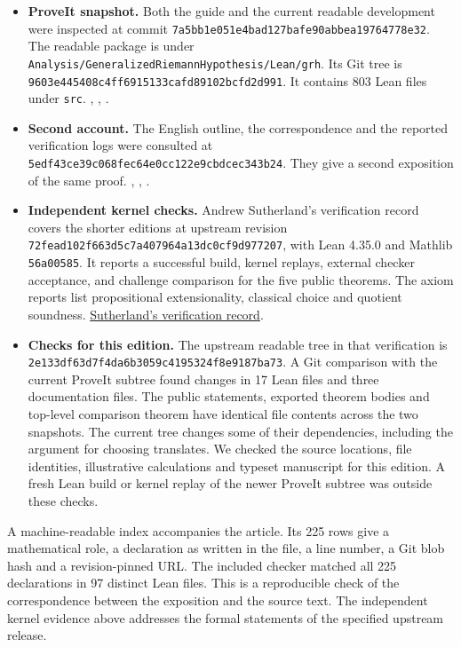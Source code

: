 \begin{itemize}
 \item \textbf{ProveIt snapshot.} Both the guide and the current readable development were inspected at commit \texttt{7a5bb1e051e4bad127bafe90abbea19764778e32}. The readable package is under \texttt{Analysis/GeneralizedRiemannHypothesis/Lean/grh}. Its Git tree is \texttt{9603e445408c4ff6915133cafd89102bcfd2d991}. It contains 803 Lean files under \texttt{src}. , , .
 \item \textbf{Second account.} The English outline, the correspondence and the reported verification logs were consulted at \texttt{5edf43ce39c068fec64e0cc122e9cbdcec343b24}. They give a second exposition of the same proof. , , .
 \item \textbf{Independent kernel checks.} Andrew Sutherland's verification record covers the shorter editions at upstream revision \texttt{72fead102f663d5c7a407964a13dc0cf9d977207}, with Lean 4.35.0 and Mathlib \texttt{56a00585}. It reports a successful build, kernel replays, external checker acceptance, and challenge comparison for the five public theorems. The axiom reports list propositional extensionality, classical choice and quotient soundness. \href{https://math.mit.edu/~drew/shortgrh/}{Sutherland's verification record}.
 \item \textbf{Checks for this edition.} The upstream readable tree in that verification is \texttt{2e133df63d7f4da6b3059c4195324f8e9187ba73}. A Git comparison with the current ProveIt subtree found changes in 17 Lean files and three documentation files. The public statements, exported theorem bodies and top-level comparison theorem have identical file contents across the two snapshots. The current tree changes some of their dependencies, including the argument for choosing translates. We checked the source locations, file identities, illustrative calculations and typeset manuscript for this edition. A fresh Lean build or kernel replay of the newer ProveIt subtree was outside these checks.
\end{itemize}
A machine-readable index accompanies the article. Its 225 rows give a mathematical role, a declaration as written in the file, a line number, a Git blob hash and a revision-pinned URL. The included checker matched all 225 declarations in 97 distinct Lean files. This is a reproducible check of the correspondence between the exposition and the source text. The independent kernel evidence above addresses the formal statements of the specified upstream release.

